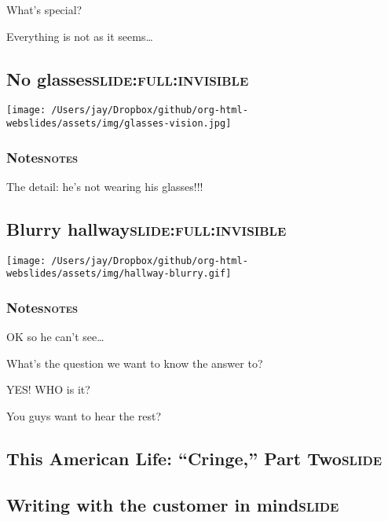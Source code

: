 \documentclass[12pt]{article}
\begin{document}
What's special?

Everything is not as it seems\ldots{}

\subsection[No glasses]{No glasses\hfill{}\textsc{slide:full:invisible}}
\label{sec:org56fa5c6}
\begin{center}
\texttt{[image: /Users/jay/Dropbox/github/org-html-webslides/assets/img/glasses-vision.jpg]}
\end{center}

\subsubsection[Notes]{Notes\hfill{}\textsc{notes}}
\label{sec:org5d037b8}
The detail: he's not wearing his glasses!!!

\subsection[Blurry hallway]{Blurry hallway\hfill{}\textsc{slide:full:invisible}}
\label{sec:org3e5d91f}
\begin{center}
\texttt{[image: /Users/jay/Dropbox/github/org-html-webslides/assets/img/hallway-blurry.gif]}
\end{center}

\subsubsection[Notes]{Notes\hfill{}\textsc{notes}}
\label{sec:org666ba5e}
OK so he can't see\ldots{}

What's the question we want to know the answer to?

YES! WHO is it?

You guys want to hear the rest?

\subsection[This American Life: ``Cringe,'' Part Two]{This American Life: ``Cringe,'' Part Two\hfill{}\textsc{slide}}
\label{sec:orgbef2ade}

\subsection[\textbf{Writing} with the customer \textbf{in mind}]{\textbf{Writing} with the customer \textbf{in mind}\hfill{}\textsc{slide}}
\label{sec:orgabbf750}
\end{document}
